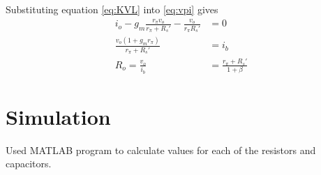 \documentclass[a4paper,11pt]{article}
\begin{document}
Substituting equation \ref{eq:KVL} into \ref{eq:vpi} gives
\begin{align}
i_o -g_m \frac{r_\pi v_o}{r_\pi + R_s'} - \frac{v_o}{r_\pi R_s'} &= 0 \nonumber \\
\frac{v_o (1 + g_m r_\pi)}{r_\pi + R_s'} &= i_b \nonumber \\
R_o = \frac{v_o}{i_b} &= \frac{r_\pi + R_s'}{1 + \beta} \label{eq:output_imp_collector}
\end{align}


\section{Simulation}

Used MATLAB program to calculate values for each of the resistors and capacitors. 

\begin{figure}[H]
	\centering
	\hspace{0.5cm}
\end{figure}
\end{document}

